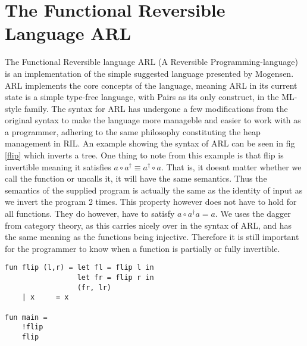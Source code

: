 \documentclass[a4paper]{article}
\begin{document}
\section{The Functional Reversible Language ARL}
\label{sec:org8e09fd4}
The Functional Reversible language ARL (A Reversible Programming-language) is an
implementation of the simple suggested language presented by Mogensen. ARL implements the core concepts of the language, meaning ARL in its current state is a simple type-free language, with Pairs as its only construct, in the ML-style family. The syntax for ARL has undergone a few modifications from the original syntax to make
the language more manageble and easier to work with as a programmer, adhering to
the same philosophy constituting the heap management in RIL. An example showing the syntax of ARL can be seen in fig \ref{flip} which inverts a tree. One thing to note from this example is
that flip is invertible meaning it satisfies \(a \circ a^{\dag} \equiv a^{\dag} \circ a\).
That is, it doesnt matter whether we call the function or uncalls it, it will have the same semantics. Thus the semantics of the supplied program is actually the same as the identity of input as we invert the program 2 times. This property however does not have to hold for all functions. They do however, have to satisfy \(a \circ a^{\dag} a = a\). We uses the dagger from category theory, as this carries nicely over in the syntax of ARL, and has the same meaning as the functions being injective. Therefore it is still important for the programmer to know when a function is partially or fully invertible.

\begin{verbatim}
fun flip (l,r) = let fl = flip l in
                 let fr = flip r in
                 (fr, lr)
    | x     = x

fun main =
    !flip
    flip
\end{verbatim}
\end{document}
